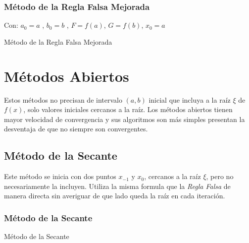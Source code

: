 \subsubsection{Método de la Regla Falsa Mejorada}
\begin{algorithm}[ht]
  Con: 
  $a_0=a$ ,
  $b_0=b$ , 
  $F=f(a)$,
  $G=f(b)$,
  $x_0=a$ 
  \\
 \caption{Método de la Regla Falsa Mejorada}
\end{algorithm}
\section{Métodos Abiertos}
Estos métodos no precisan de intervalo $(a,b)$ inicial que incluya a la raíz $\xi$ de $f(x)$, solo valores iniciales cercanos a la raíz. Los métodos abiertos tienen mayor velocidad de convergencia y sus algoritmos son más simples presentan la desventaja de que no siempre son convergentes.
\subsection{Método de la Secante}
Este método se inicia con dos puntos $x_{-1}$ y $x_0$, cercanos a la raíz $\xi$, pero no necesariamente la incluyen. Utiliza la misma formula que la \textit{Regla Falsa} de manera directa sin averiguar de que lado queda la raíz en cada iteración.
\subsubsection{Método de la Secante}
\begin{algorithm}[ht]
 \caption{Método de la Secante}
\end{algorithm}
